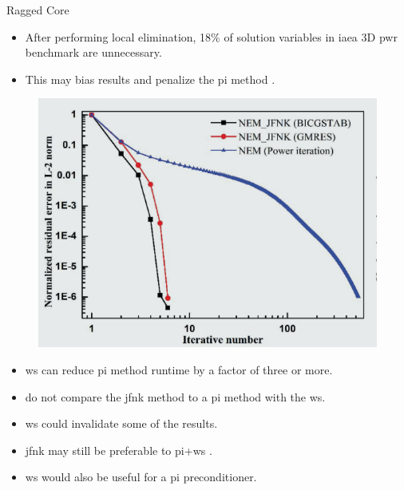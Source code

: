 \begin{frame}{Ragged Core}
  \begin{itemize}
    \item After performing local elimination, 18\% of solution variables in
      \gls{iaea} 3D \gls{pwr} benchmark are unnecessary.
    \item This may bias results and penalize the \gls{pi} method
      \cite{gehinThesis}.
  \end{itemize}
  \begin{figure}
    \centering
    \includegraphics{./figs/iaea3d_convergence.png}
  \end{figure}
\end{frame}

\begin{frame}{}
  \begin{itemize}
    \item \gls{ws} can reduce \gls{pi} method runtime by a factor of three or
      more.
    \item \citeauthor{qe2paper} do not compare the \gls{jfnk} method to a
      \gls{pi} method with the \gls{ws}.
    \item \gls{ws} could invalidate some of the results.
    \item \gls{jfnk} may still be preferable to \gls{pi}+\gls{ws} \cite{jfnk_wielandt}.
    \item \gls{ws} would also be useful for a \gls{pi} preconditioner.
  \end{itemize}
\end{frame}
